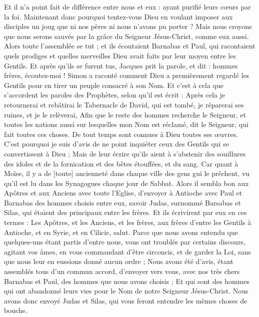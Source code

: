 \begin{multicols}{2}
Et il n'a point fait de différence entre nous et eux : ayant purifié leurs cœurs par la foi.
Maintenant donc pourquoi tentez-vous Dieu en voulant imposer aux disciples un joug que ni nos pères ni nous n'avons pu porter ?
Mais nous croyons que nous serons sauvés par la grâce du Seigneur Jésus-Christ, comme eux aussi.
Alors toute l'assemblée se tut ; et ils écoutaient Barnabas et Paul, qui racontaient quels prodiges et quelles merveilles Dieu avait faits par leur moyen entre les Gentils.
Et après qu'ils se furent tus, Jacques prit la parole, et dit : hommes frères, écoutez-moi !
Simon a raconté comment Dieu a premièrement regardé les Gentils pour en tirer un peuple consacré à son Nom.
Et c'est à cela que s'accordent les paroles des Prophètes, selon qu'il est écrit :
Après cela je retournerai et rebâtirai le Tabernacle de David, qui est tombé, je réparerai ses ruines, et je le relèverai,
Afin que le reste des hommes recherche le Seigneur, et toutes les nations aussi sur lesquelles mon Nom est réclamé, dit le Seigneur, qui fait toutes ces choses.
De tout temps sont connues à Dieu toutes ses œuvres.
C'est pourquoi je suis d'avis de ne point inquiéter ceux des Gentils qui se convertissent à Dieu ;
Mais de leur écrire qu'ils aient à s'abstenir des souillures des idoles et de la fornication et des bêtes étouffées, et du sang.
Car quant à Moïse, il y a de [toute] ancienneté dans chaque ville des gens gui le prêchent, vu qu'il est lu dans les Synagogues chaque jour de Sabbat.
Alors il sembla bon aux Apôtres et aux Anciens avec toute l'Eglise, d'envoyer à Antioche avec Paul et Barnabas des hommes choisis entre eux, savoir Judas, surnommé Barsabas et Silas, qui étaient des principaux entre les frères.
Et ils écrivirent par eux en ces termes : Les Apôtres, et les Anciens, et les frères, aux frères d'entre les Gentils à Antioche, et en Syrie, et en Cilicie, salut.
Parce que nous avons entendu que quelques-uns étant partis d'entre nous, vous ont troublés par certains discours, agitant vos âmes, en vous commandant d'être circoncis, et de garder la Loi, sans que nous leur en eussions donné aucun ordre ;
Nous avons été d'avis, étant assemblés tous d'un commun accord, d'envoyer vers vous, avec nos très chers Barnabas et Paul, des hommes que nous avons choisis ;
Et qui sont des hommes qui ont abandonné leurs vies pour le Nom de notre Seigneur Jésus-Christ.
Nous avons donc envoyé Judas et Silas, qui vous feront entendre les mêmes choses de bouche.

\end{multicols}
